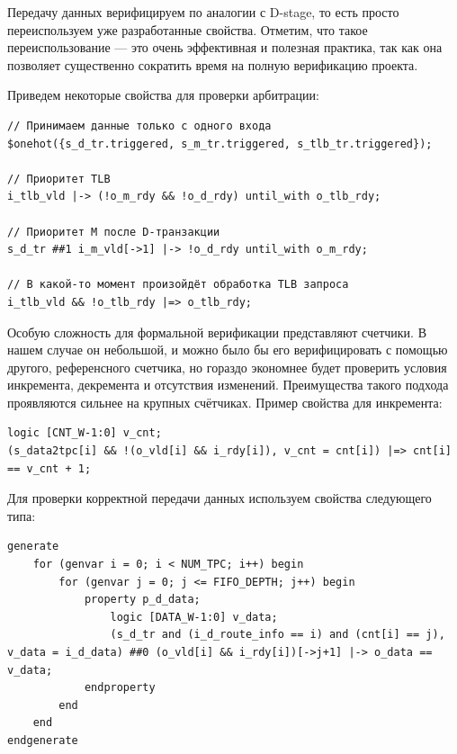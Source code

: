 Передачу данных верифицируем по аналогии с D-stage, то есть просто переиспользуем уже разработанные свойства. Отметим, что такое переиспользование --- это очень эффективная и полезная практика, так как она позволяет существенно сократить время на полную верификацию проекта.  

Приведем некоторые свойства для проверки арбитрации: \newline

\begin{minipage}{\textwidth}
\begin{lstlisting}
// Принимаем данные только с одного входа
$onehot({s_d_tr.triggered, s_m_tr.triggered, s_tlb_tr.triggered}); 

// Приоритет TLB
i_tlb_vld |-> (!o_m_rdy && !o_d_rdy) until_with o_tlb_rdy;

// Приоритет M после D-транзакции
s_d_tr ##1 i_m_vld[->1] |-> !o_d_rdy until_with o_m_rdy;

// В какой-то момент произойдёт обработка TLB запроса
i_tlb_vld && !o_tlb_rdy |=> o_tlb_rdy;
\end{lstlisting}
\end{minipage}


Особую сложность для формальной верификации представляют счетчики. В нашем случае он небольшой, и можно было бы его верифицировать с помощью другого, референсного счетчика, но гораздо экономнее будет проверить условия инкремента, декремента и отсутствия изменений. Преимущества такого подхода проявляются сильнее на крупных счётчиках. Пример свойства для инкремента: \newline

\begin{minipage}{\textwidth}
\begin{lstlisting}
logic [CNT_W-1:0] v_cnt;
(s_data2tpc[i] && !(o_vld[i] && i_rdy[i]), v_cnt = cnt[i]) |=> cnt[i] == v_cnt + 1;
\end{lstlisting}
\end{minipage}

Для проверки корректной передачи данных используем свойства следующего типа: \newline

\begin{minipage}{\textwidth}
\begin{lstlisting}
generate
    for (genvar i = 0; i < NUM_TPC; i++) begin
        for (genvar j = 0; j <= FIFO_DEPTH; j++) begin 
            property p_d_data;
                logic [DATA_W-1:0] v_data;
                (s_d_tr and (i_d_route_info == i) and (cnt[i] == j), v_data = i_d_data) ##0 (o_vld[i] && i_rdy[i])[->j+1] |-> o_data == v_data;
            endproperty
        end
    end
endgenerate 
\end{lstlisting}
\end{minipage}

